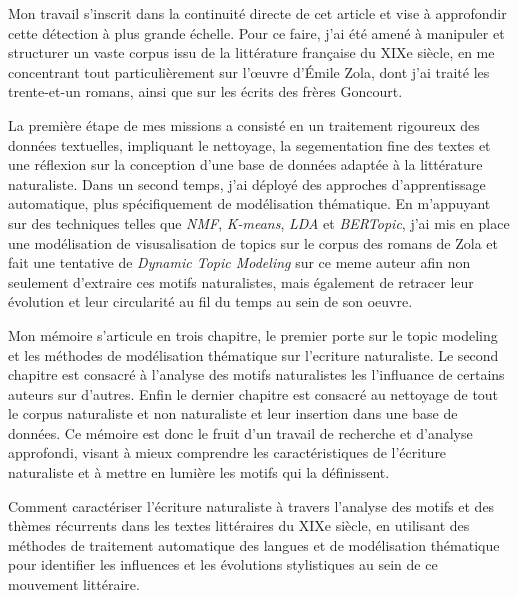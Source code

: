 Mon travail s'inscrit dans la continuité directe de cet article et vise à approfondir cette détection à plus grande échelle. Pour ce faire, j'ai été amené à manipuler et structurer un vaste corpus issu de la littérature française du XIXe siècle, en me concentrant tout particulièrement sur l'œuvre d'Émile Zola, dont j'ai traité les trente-et-un romans, ainsi que sur les écrits des frères Goncourt.

La première étape de mes missions a consisté en un traitement rigoureux des données textuelles, impliquant le nettoyage, la segementation fine des textes et une réflexion sur la conception d'une base de données adaptée à la littérature naturaliste. Dans un second temps, j'ai déployé des approches d'apprentissage automatique, plus spécifiquement de modélisation thématique. En m'appuyant sur des techniques telles que \textit{NMF}, \textit{K-means}, \textit{LDA} et \textit{BERTopic}, j'ai mis en place une modélisation de visusalisation de topics sur le corpus des romans de Zola et fait une tentative de \textit{Dynamic Topic Modeling} sur ce meme auteur afin non seulement d'extraire ces motifs naturalistes, mais également de retracer leur évolution et leur circularité au fil du temps au sein de son oeuvre.

Mon mémoire s'articule en trois chapitre, le premier porte sur le topic modeling et les méthodes de modélisation thématique sur l'ecriture naturaliste. Le second chapitre est consacré à l'analyse des motifs naturalistes les l'influance de certains auteurs sur d'autres. Enfin le dernier chapitre est consacré au nettoyage de tout le corpus naturaliste et non naturaliste et leur insertion dans une base de données. Ce mémoire est donc le fruit d'un travail de recherche et d'analyse approfondi, visant à mieux comprendre les caractéristiques de l'écriture naturaliste et à mettre en lumière les motifs qui la définissent.

Comment caractériser l'écriture naturaliste à travers l'analyse des motifs et des thèmes récurrents dans les textes littéraires du XIXe siècle, en utilisant des méthodes de traitement automatique des langues et de modélisation thématique pour identifier les influences et les évolutions stylistiques au sein de ce mouvement littéraire.
